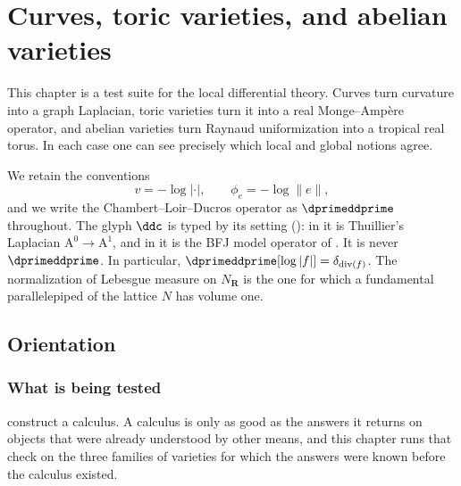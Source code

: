 \chapter{Curves, toric varieties, and abelian varieties}
\label{chap:cld-examples}

This chapter is a test suite for the local differential theory.  Curves turn
curvature into a graph Laplacian, toric varieties turn it into a real
Monge--Amp\`ere operator, and abelian varieties turn Raynaud uniformization
into a tropical real torus.  In each case one can see precisely which local
and global notions agree.

We retain the conventions
\[
           v=-\log|\cdot|,\qquad \phi_e=-\log\|e\| ,
\]
and we write the Chambert--Loir--Ducros operator as $\dprimeddprime$
throughout.  The glyph $\ddc$ is typed by its setting
(): in  it is
Thuillier's Laplacian $\mathrm A^0\to\mathrm A^1$, and in
 it is the BFJ model operator of
.  It is never $\dprimeddprime$.
In particular, $\dprimeddprime[\log|f|]=\delta_{\operatorname{div}(f)}$.
The normalization of Lebesgue measure on $N_{\mathbf R}$ is the one for
which a fundamental parallelepiped of the lattice $N$ has volume one.

\section{Orientation}
\label{sec:ch19-orientation}

\subsection{What is being tested}
\label{sec:ch19-what-tested}

 construct a calculus.  A
calculus is only as good as the answers it returns on objects that were
already understood by other means, and this chapter runs that check on the
three families of varieties for which the answers were known before the
calculus existed.


